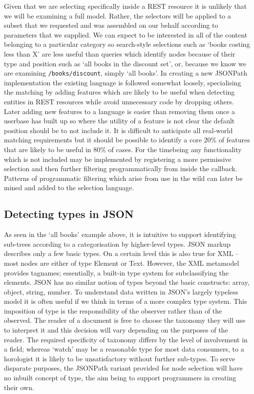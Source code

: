 \documentclass[12pt, ]{article}
\begin{document}
Given that we are selecting specifically inside a REST resource it is
unlikely that we will be examining a full model. Rather, the selectors
will be applied to a subset that we requested and was assembled on our
behalf according to parameters that we supplied. We can expect to be
interested in all of the content belonging to a particular category so
search-style selections such as `books costing less than X' are less
useful than queries which identify nodes because of their type and
position such as `all books in the discount set', or, because we know we
are examining \texttt{/books/discount}, simply `all books'. In creating
a new JSONPath implementation the existing language is followed somewhat
loosely, specialising the matching by adding features which are likely
to be useful when detecting entities in REST resources while avoid
unnecessary code by dropping others. Later adding new features to a
language is easier than removing them once a userbase has built up so
where the utility of a feature is not clear the default position should
be to not include it. It is difficult to anticipate all real-world
matching requirements but it should be possible to identify a core 20\%
of features that are likely to be useful in 80\% of cases. For the
timebeing any functionality which is not included may be implemented by
registering a more permissive selection and then further filtering
programmatically from inside the callback. Patterns of programmatic
filtering which arise from use in the wild can later be mined and added
to the selection language.

\subsection{Detecting types in JSON}\label{detecting-types-in-json}

As seen in the `all books' example above, it is intuitive to support
identifying sub-trees according to a categorisation by higher-level
types. JSON markup describes only a few basic types. On a certain level
this is also true for XML -- most nodes are either of type Element or
Text. However, the XML metamodel provides tagnames; essentially, a
built-in type system for subclassifying the elements. JSON has no
similar notion of types beyond the basic constructs: array, object,
string, number. To understand data written in JSON's largely typeless
model it is often useful if we think in terms of a more complex type
system. This imposition of type is the responsibility of the observer
rather than of the observed. The reader of a document is free to choose
the taxonomy they will use to interpret it and this decision will vary
depending on the purposes of the reader. The required specificity of
taxonomy differs by the level of involvement in a field; whereas `watch'
may be a reasonable type for most data consumers, to a horologist it is
likely to be unsatisfactory without further sub-types. To serve
disparate purposes, the JSONPath variant provided for node selection
will have no inbuilt concept of type, the aim being to support
programmers in creating their own.
\end{document}
